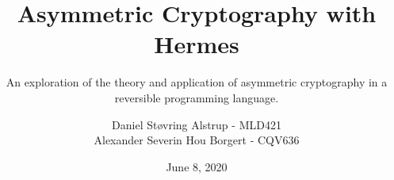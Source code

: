 \documentclass[a4paper,11pt,oneside]{memoir}
\begin{document}

\thesiscomment{} %
\title{Asymmetric Cryptography with Hermes}
\subtitle{An exploration of the theory and application of asymmetric cryptography in a reversible programming language.} %
\author{%
  Daniel Støvring Alstrup - MLD421\\[4pt]
  Alexander Severin Hou Borgert - CQV636}
\date{June 8, 2020} %

\pagestyle{plain}
\maketitle

\cleardoublepage
{}
\setcounter{page}{3}

\cleardoublepage
\pagestyle{plain}
\begin{abstract}


\end{abstract}


\begin{resume}

\end{resume}

\cleardoublepage
{}
\tableofcontents*

\cleardoublepage
{}
\setcounter{page}{1}




%

\end{document}
